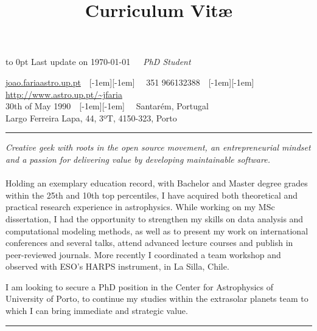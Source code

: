 \documentclass[10pt]{moderncv}
\title{Curriculum Vit\ae{}}
\newcommand\maintitle[3]{\vbox to 0pt{\hfill\scriptsize\color{gray} #3}\vspace{-0.4em}\noindent{\LARGE \textbf{#1}}\ \ \ \emph{#2}}
\newcommand{\breakvspace}[1]{\pagebreak[2]\vspace{#1}\pagebreak[2]}
\newcommand{\nobreakvspace}[1]{\nopagebreak[4]\vspace{#1}\nopagebreak[4]}
\newcommand{\spacedhrule}[2]{\breakvspace{#1}\hrule\nobreakvspace{#2}}
\newcommand*\bull{\raisebox{-0.365em}[-1em][-1em]{\textscale{4}{$\cdot$}}}
\newcommand*\sbull{\ \ \bull \ \ }
\begin{document}

\maintitle{Jo\~{a}o Pedro de Sousa Faria}{PhD Student}{Last update on \today}

\nobreakvspace{0.3em}  %

\noindent \href{mailto:joao.faria@astro.up.pt}{joao.faria\MVAt astro.up.pt}\sbull
\textsmaller{+}351 966132388\sbull
\href{http://www.astro.up.pt/\~jfaria}{http://www.astro.up.pt/\textasciitilde jfaria}
\\
30th of May 1990\sbull
Santarém, Portugal
\\
Largo Ferreira Lapa, 44, 3ºT, 4150-323, Porto



\spacedhrule{1.1em}{0.4em}  %
\vspace{-1em}  %
\begin{multicols}{2}  %
\noindent \emph{Creative geek with roots in the open source movement, an entrepreneurial mindset and a passion for delivering value by developing maintainable software.}
\\
\\
Holding an exemplary education record, 
with Bachelor and Master degree grades within the 25th and 10th top percentiles, 
I have acquired both theoretical and practical research experience in astrophysics.
While working on my MSc dissertation, 
I had the opportunity to strengthen my skills on data analysis and computational modeling methods,
as well as to present my work on international conferences and several talks, 
attend advanced lecture courses
and publish in peer-reviewed journals. 
More recently I coordinated a team workshop and observed with ESO's HARPS instrument, in La Silla, Chile.

I am looking to secure a PhD position in the Center for Astrophysics of University of Porto, 
to continue my studies within the extrasolar planets team to which I can bring immediate and
strategic value.
\end{multicols}
\spacedhrule{0.4em}{0.4em}  %
\end{document}
